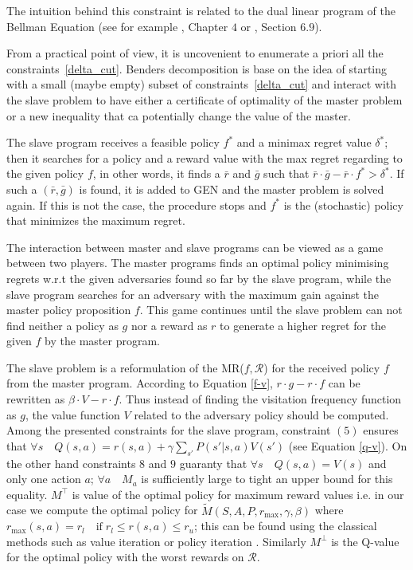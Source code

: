 \documentclass[runningheads,a4paper]{llncs}
\begin{document}
The intuition behind this constraint is related to the dual linear program of the Bellman Equation (see for example \cite{Sutton1998}, Chapter $4$ or \citep{Puterman1994}, Section $6.9$). 

From a practical point of view, it is uncovenient to enumerate a priori all the constraints~\eqref{delta_cut}. Benders decomposition is base on the idea of starting with a small (maybe empty) subset of constraints~\eqref{delta_cut} and interact with the slave problem to have either a certificate of optimality of the master problem or a new inequality that ca potentially change the value of the master.

The slave program receives a feasible policy $f^*$ and a minimax regret value $\delta^*$; then it searches for a policy and a reward value with the max regret regarding to the given policy $f$, in other words, it finds a $\bar{r}$ and $\bar{g}$ such that $\bar{r} \cdot \bar{g}  - \bar{r}  \cdot f^* > \delta^*$. If such a $(\bar{r},\bar{g})$ is found, it is added to GEN and the master problem is solved again. If this is not the case, the procedure stops and $f^*$ is the (stochastic) policy that minimizes the maximum regret. 

The interaction between master and slave programs can be viewed as a game between two players. The master programs finds an optimal policy minimising regrets w.r.t the given adversaries found so far by the slave program, while the slave program searches for an adversary with the maximum gain against the master policy proposition $f$. This game continues until the slave problem can not find neither a policy as $g$ nor a reward as $r$ to generate a higher regret for the given $f$ by the master program.  

The slave problem is a reformulation of the MR($f, \mathcal{R}$) for the received policy $f$ from the master program. According to Equation \ref{f-v}, $r \cdot g - r \cdot f$ can be rewritten as $\beta \cdot V - r \cdot f$. Thus instead of finding the visitation frequency function as $g$, the value function $V$ related to the adversary policy should be computed. Among the presented constraints for the slave program, constraint $(5)$ ensures that $\forall s \quad Q(s, a) = r(s,a) + \gamma \sum_{s'} P(s'|s,a)V(s')$ (see Equation \ref{q-v}). On the other hand constraints $8$ and $9$ guaranty that $\forall s \quad Q(s, a) = V(s)$ and only one action $a$; $\forall a \quad M_a$ is sufficiently large to tight an upper bound for this equality. $M^{\top}$ is value of the optimal policy for maximum reward values i.e. in our case we compute the optimal policy for $\tilde{M}(S, A, P, r_{\text{max}}, \gamma, \beta)$ where $r_{\text{max}}(s, a) = r_l \quad \text{if} \; r_l \leq r(s, a) \leq r_u$; this can be found using the classical methods such as value iteration or policy iteration \cite{Sutton1998}. Similarly $M^{\perp}$ is the Q-value for the optimal policy with the worst rewards on $\mathcal{R}$. 
\end{document}
